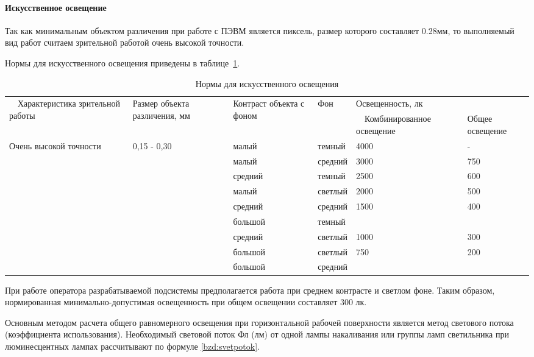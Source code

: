 \paragraph{Искусственное освещение}

Так как минимальным объектом различения при работе с ПЭВМ является пиксель, размер которого составляет 0.28мм, то выполняемый вид работ считаем зрительной работой очень высокой точности\cite{SP52}. 

Нормы для искусственного освещения приведены в таблице~\ref{bzd:svet}.

\begin{table}[!htb]
	\caption{Нормы для искусственного освещения}\label{bzd:svet}
    \centering
	\begin{tabular}{|p{3cm}|p{}|p{2cm}|p{2cm}|p{3cm}|p{2cm}|}
	\hline 
	\multirow{2}{3cm}{~\ Характеристика зрительной работы} &
	\multirow{2}{2,5cm}{Размер объекта различения, мм} & 
	\multirow{2}{2cm}{Контраст объекта с фоном} &
	\multirow{2}{2cm}{Фон} &
	\multicolumn{2}{p{5cm}|}{Освещенность, лк}\\ 
	\cline{5-6} 
	 &  &  &  & ~\ Комбинированное освещение &  Общее освещение \\ 
	\hline 
	\multirow{4}{3cm}{Очень высокой точности} &
	\multirow{4}{2,5cm}{0,15 - 0,30} & 
	малый & темный & 4000 & - \\
	\cline{3-6} 
	& & малый & средний & 3000 & 750 \\
	& & средний & темный & 2500 & 600 \\
	\cline{3-6} 
	& & малый & светлый & 2000 & 500 \\
	& & средний & средний & 1500 & 400 \\
	& & большой & темный &  &  \\
	\cline{3-6} 
	& & средний & светлый & 1000 & 300 \\
	& & большой & светлый & 750 & 200 \\
	& & большой & средний &  &  \\
	\hline
	\end{tabular} 
    		
\end{table}

При работе оператора разрабатываемой подсистемы предполагается работа при среднем контрасте и светлом фоне. Таким образом, нормированная минимально-допустимая освещенность при общем освещении составляет 300 лк. 

Основным методом расчета общего равномерного освещения при горизонтальной рабочей поверхности является метод светового потока (коэффициента использования). Необходимый световой поток Фл (лм) от одной лампы накаливания или группы ламп светильника при люминесцентных лампах рассчитывают по формуле \ref{bzd:svetpotok}.

